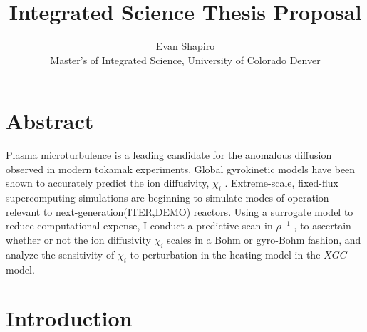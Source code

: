 \documentclass{article}
\title{Integrated Science Thesis Proposal}
\author{Evan Shapiro \\ Master's of Integrated Science, University of Colorado Denver}
\begin{document}
\section{Abstract}
Plasma microturbulence is a leading candidate for the anomalous
diffusion observed in modern tokamak experiments. Global gyrokinetic
models have been shown to accurately predict the ion diffusivity, $\chi_i$
. Extreme-scale, fixed-flux supercomputing simulations are beginning
to simulate modes of operation relevant to next-generation(ITER,DEMO)
reactors. Using a surrogate model to reduce computational expense, I conduct a predictive scan
in $\rho^{-1}$ , to ascertain
whether or not the ion diffusivity $\chi_i$ scales in a Bohm or gyro-Bohm
fashion, and analyze the sensitivity of $\chi_i$ to perturbation in the heating
model in the $XGC$ model.

\maketitle
\tableofcontents


\section{Introduction}
\end{document}
